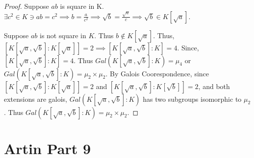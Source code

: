 \documentclass{article}
\begin{document}
\begin{proof}
    
    Suppose $ab$ is square in K. $\exists c^2 \in K \ni ab = c^2 \implies b = \frac{a}{c^2} \implies \sqrt{b} = \frac{\sqrt{a}}{c} \implies \sqrt{b} \in K[\sqrt{a}]$.
    
    Suppose $ab$ is not square in $K$. Thus $b \not \in K[\sqrt{a}]$. Thus, $[K[\sqrt{a}, \sqrt{b}] : K[\sqrt{a}]] = 2 \implies [K[\sqrt{a}, \sqrt{b}] : K] = 4$. Since, $[K[\sqrt{a}, \sqrt{b}] : K]= 4$. Thus $Gal(K[\sqrt{a}, \sqrt{b}] : K) = \mu_4$ or $Gal(K[\sqrt{a}, \sqrt{b}] : K) = \mu_2 \times \mu_2$. By Galois Coorespondence, since $[K[\sqrt{a}, \sqrt{b}] : K[\sqrt{a}]] = 2$ and $[K[\sqrt{a}, \sqrt{b}] : K[\sqrt{b}]] = 2$, and both extensions are galois,  $Gal(K[\sqrt{a}, \sqrt{b}] : K)$ has two subgroups isomorphic to $\mu_2$. Thus $Gal(K[\sqrt{a}, \sqrt{b}] : K) = \mu_2 \times \mu_2$. 
\end{proof}

\bigskip

\section*{Artin Part 9}
\end{document}
